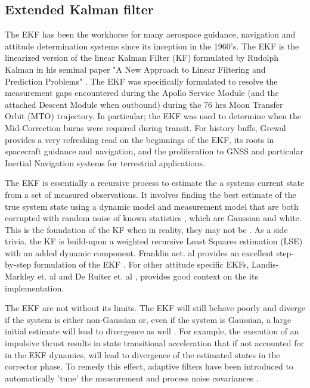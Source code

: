 \subsection{Extended Kalman filter}\label{CHAP1_3_1}
The EKF has been the workhorse for many aerospace guidance, navigation and attitude determination systems since its inception in the 1960's. The EKF is the linearized version of the linear Kalman Filter (KF) formulated by Rudolph Kalman in his seminal paper "A New Approach to Linear Filtering and Prediction Problems" \cite{Klmn1960ANA}. The EKF was specifically formulated to resolve the measurement gaps encountered during the Apollo Service Module (and the attached Descent Module when outbound) during the 76 hrs Moon Transfer Orbit (MTO) trajectory. In particular; the EKF was used to determine when the Mid-Correction burns were required during transit. For history buffs, Grewal \cite{grewalKFHistory10} provides a very refreshing read on the beginnings of the EKF, its roots in spacecraft guidance and navigation, and the proliferation to GNSS and particular Inertial Navigation systems for terrestrial applications.  

The EKF is essentially a recursive process to estimate the a systems current state  from a set of measured observations. It involves finding the best estimate of the true system state using a dynamic model and measurement model that are both corrupted with random noise of known statistics \cite{landisMarkleyFundamentalsOfADCSSpacecraft15}, which are Gaussian and white. This is the foundation of the KF when in reality, they may not be \cite{franklinDigitalControl97}. As a side trivia, the KF is build-upon a weighted recursive Least Squares estimation (LSE) with an added dynamic component. Franklin aet. al provides an excellent step-by-step formulation of the EKF \cite{franklinDigitalControl97}. For other attitude specific EKFs, Landis-Markley et. al \cite{landisMarkleyFundamentalsOfADCSSpacecraft15} and De Ruiter et. al \cite{deRuiter2012spacecraft}, provides good context on the its implementation. 
 
The EKF are not without its limits. The EKF will still behave poorly and diverge if the system is either non-Gaussian or, even if the system is Gaussian, a large initial estimate will lead to divergence as well \cite{franklinDigitalControl97}. For example, the execution of an impulsive thrust results in state transitional acceleration that if not accounted for in the EKF dynamics, will lead to divergence of the estimated states in the corrector phase. To remedy this effect, adaptive filters have been introduced to automatically 'tune' the measurement and process noise covariances \cite{frasierAdaptiveKF18, woffidenRez07}. 

